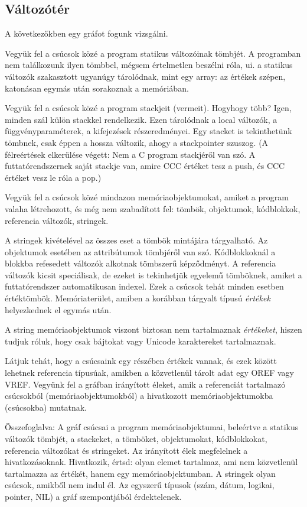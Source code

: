 \subsection{Változótér}

A következőkben egy gráfot fogunk vizsgálni.

Vegyük fel a csúcsok közé a program statikus változóinak tömbjét.
A programban nem találkozunk ilyen tömbbel, mégsem értelmetlen beszélni
róla, ui. a statikus változók szakasztott ugyanúgy tárolódnak, mint egy array:
az értékek szépen, katonásan egymás után sorakoznak a memóriában.

Vegyük fel a csúcsok közé a program stackjeit (vermeit). 
Hogyhogy több? Igen, minden szál külön stackkel rendelkezik.
Ezen tárolódnak a local változók, a függvény\-paraméterek, 
a kifejezések részeredményei. Egy stacket is tekinthetünk tömbnek, 
csak éppen a hossza változik, ahogy a stackpointer szuszog.
(A félreértések elkerülése végett: 
Nem a C program stackjéről van szó.
A futtatórendszernek saját stackje van,
amire CCC értéket tesz a push, és CCC értéket vesz le róla a pop.)


Vegyük fel a csúcsok közé mindazon memóriaobjektumokat,
amiket a program valaha létrehozott, és még nem szabadított fel:
tömbök, objektumok, kódblokkok, referencia változók, stringek.

A stringek kivételével az összes eset a tömbök mintájára tárgyalható.
Az objektumok esetében az attribútumok tömbjéről van szó.
Kódblokkoknál a blokkba refesedett változók alkotnak tömbszerű
képződményt. A referencia változók kicsit speciálisak,
de ezeket is tekinhetjük egyelemű tömböknek, amiket a futtatórendszer
automatikusan indexel. Ezek a csúcsok tehát minden esetben értéktömbök. 
Memóriaterület, amiben a korábban tárgyalt típusú {\em értékek\/} helyezkednek 
el egymás után.

A string memóriaobjektumok viszont biztosan nem tartalmaznak 
{\em értékeket}, hiszen tudjuk róluk, hogy csak bájtokat vagy Unicode
karaktereket tartalmaznak.

Látjuk tehát, hogy a csúcsaink egy részében értékek vannak, és ezek
között lehetnek referencia típusúak, amikben a közvetlenül tárolt adat egy
OREF vagy VREF.  
Vegyünk fel a gráfban irányított éleket, amik a referenciát tartalmazó csúcsokból 
(memóriaobjektumokból) a hivatkozott memóriaobjektumokba (csúcsokba) mutatnak.
 

Összefoglalva: 
A gráf csúcsai a program memóriaobjektumai, beleértve
a statikus változók tömbjét, a stackeket, a tömböket, objektumokat,
kódblokkokat, referencia változókat és stringeket. Az irányított élek
megfelelnek a hivatkozásoknak. Hivatkozik, értsd: olyan elemet tartalmaz,
ami nem közvetlenül tartalmazza az értékét, hanem egy memóriaobjektumban.
A stringek olyan csúcsok, amikből nem indul él. Az egyszerű típusok
(szám, dátum, logikai, pointer, NIL) a gráf szempontjából érdektelenek.


